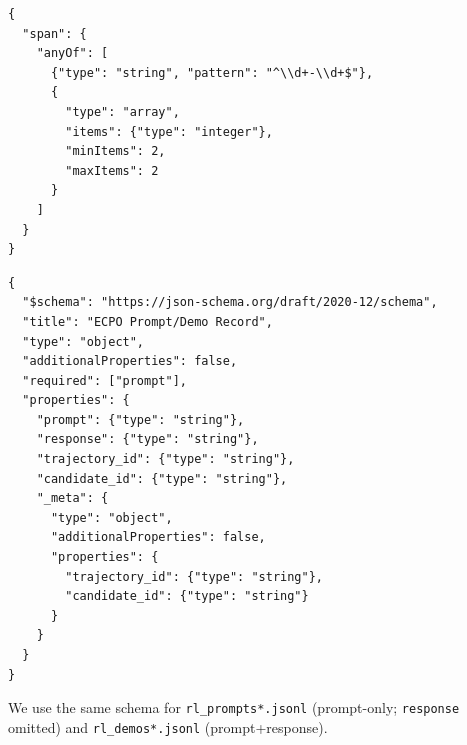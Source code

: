 \documentclass{article}
\begin{document}
\begin{lstlisting}[caption={Shared span definition used across schema files.},label={lst:schema-def-span}]
{
  "span": {
    "anyOf": [
      {"type": "string", "pattern": "^\\d+-\\d+$"},
      {
        "type": "array",
        "items": {"type": "integer"},
        "minItems": 2,
        "maxItems": 2
      }
    ]
  }
}
\end{lstlisting}

\begin{lstlisting}[caption={Schema excerpt for \texttt{rl\_prompts.schema.json} (RL Prompt/Demo Record; \texttt{response} optional).},label={lst:schema-rlprompts}]
{
  "$schema": "https://json-schema.org/draft/2020-12/schema",
  "title": "ECPO Prompt/Demo Record",
  "type": "object",
  "additionalProperties": false,
  "required": ["prompt"],
  "properties": {
    "prompt": {"type": "string"},
    "response": {"type": "string"},
    "trajectory_id": {"type": "string"},
    "candidate_id": {"type": "string"},
    "_meta": {
      "type": "object",
      "additionalProperties": false,
      "properties": {
        "trajectory_id": {"type": "string"},
        "candidate_id": {"type": "string"}
      }
    }
  }
}
\end{lstlisting}

We use the same schema for \texttt{rl\_prompts*.jsonl} (prompt-only; \texttt{response} omitted) and \texttt{rl\_demos*.jsonl} (prompt+response).
\end{document}

